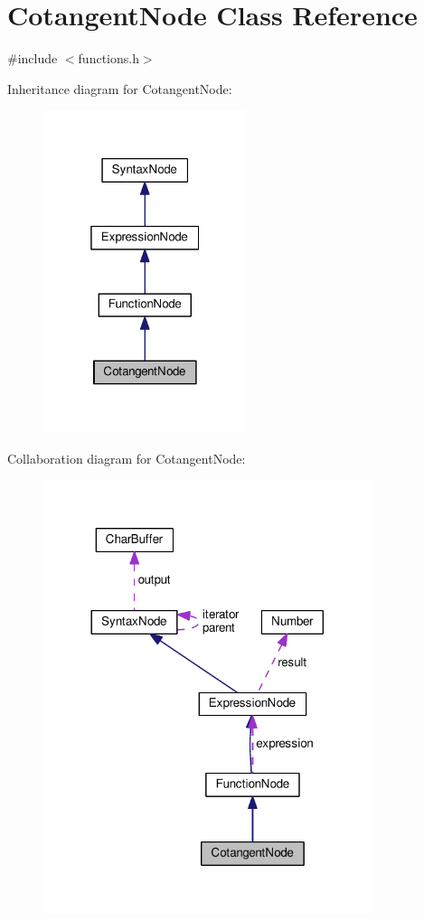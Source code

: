 \hypertarget{classCotangentNode}{}\section{Cotangent\+Node Class Reference}
\label{classCotangentNode}


{\ttfamily \#include $<$functions.\+h$>$}



Inheritance diagram for Cotangent\+Node\+:
\nopagebreak
\begin{figure}[H]
\begin{center}
\leavevmode
\includegraphics[width=169pt]{d4/da5/classCotangentNode__inherit__graph}
\end{center}
\end{figure}


Collaboration diagram for Cotangent\+Node\+:
\nopagebreak
\begin{figure}[H]
\begin{center}
\leavevmode
\includegraphics[width=272pt]{d6/dd2/classCotangentNode__coll__graph}
\end{center}
\end{figure}
